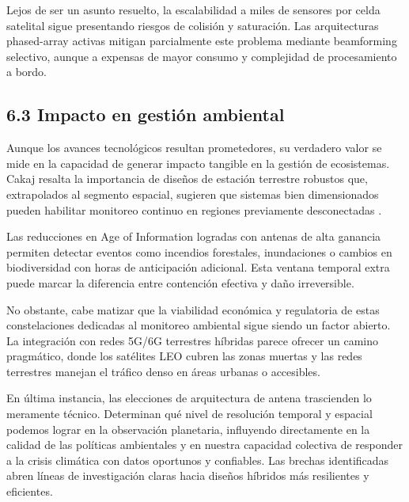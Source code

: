 Lejos de ser un asunto resuelto, la escalabilidad a miles de sensores por celda satelital sigue presentando riesgos de colisión y saturación. Las arquitecturas phased-array activas mitigan parcialmente este problema mediante beamforming selectivo, aunque a expensas de mayor consumo y complejidad de procesamiento a bordo.

\subsection{6.3 Impacto en gestión ambiental}

Aunque los avances tecnológicos resultan prometedores, su verdadero valor se mide en la capacidad de generar impacto tangible en la gestión de ecosistemas. Cakaj resalta la importancia de diseños de estación terrestre robustos que, extrapolados al segmento espacial, sugieren que sistemas bien dimensionados pueden habilitar monitoreo continuo en regiones previamente desconectadas \cite{Cakaj2023}.

Las reducciones en Age of Information logradas con antenas de alta ganancia permiten detectar eventos como incendios forestales, inundaciones o cambios en biodiversidad con horas de anticipación adicional. Esta ventana temporal extra puede marcar la diferencia entre contención efectiva y daño irreversible. 

No obstante, cabe matizar que la viabilidad económica y regulatoria de estas constelaciones dedicadas al monitoreo ambiental sigue siendo un factor abierto. La integración con redes 5G/6G terrestres híbridas parece ofrecer un camino pragmático, donde los satélites LEO cubren las zonas muertas y las redes terrestres manejan el tráfico denso en áreas urbanas o accesibles.

En última instancia, las elecciones de arquitectura de antena trascienden lo meramente técnico. Determinan qué nivel de resolución temporal y espacial podemos lograr en la observación planetaria, influyendo directamente en la calidad de las políticas ambientales y en nuestra capacidad colectiva de responder a la crisis climática con datos oportunos y confiables. Las brechas identificadas abren líneas de investigación claras hacia diseños híbridos más resilientes y eficientes.